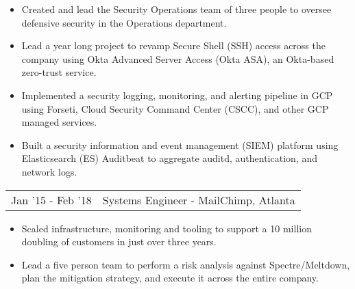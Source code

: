\documentclass[letterpaper]{article}
\begin{document}
\begin{itemize}[itemsep=0.5pt]
	\item Created and lead the Security Operations team of three people to oversee defensive security in the Operations department.
	\item Lead a year long project to revamp Secure Shell (SSH) access across the company using Okta Advanced Server Access (Okta ASA), an Okta-based zero-trust service. 
	\item Implemented a security logging, monitoring, and alerting pipeline in GCP using Forseti, Cloud Security Command Center (CSCC), and other GCP managed services.
	\item Built a security information and event management (SIEM) platform using Elasticsearch (ES) Auditbeat to aggregate auditd, authentication, and network logs.
\end{itemize}
\begin{tabular}{l|l}
{Jan '15 - Feb '18} & Systems Engineer - MailChimp, Atlanta\\
\end{tabular}
\begin{itemize}[itemsep=0.5pt]
	\item Scaled infrastructure, monitoring and tooling to support a 10 million doubling of customers in just over three years.
	\item Lead a five person team to perform a risk analysis against Spectre/Meltdown, plan the mitigation strategy, and execute it across the entire company.
\end{itemize}
\end{document}
